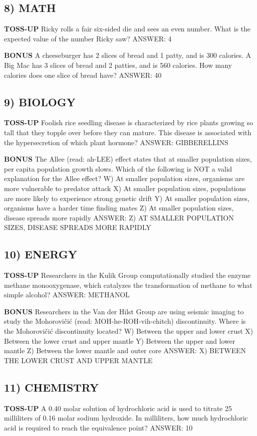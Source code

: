 \documentclass{article}
\begin{document}
\subsection*{8) MATH}
\textbf{TOSS-UP}
Ricky rolls a fair six-sided die and sees an even number. What is the expected value of the number Ricky saw?
ANSWER: 4

\textbf{BONUS}
A cheeseburger has 2 slices of bread and 1 patty, and is 300 calories. A Big Mac has 3 slices of bread and 2 patties, and is 560 calories. How many calories does one slice of bread have?
ANSWER: 40

\subsection*{9) BIOLOGY}
\textbf{TOSS-UP}
Foolish rice seedling disease is characterized by rice plants growing so tall that they topple over before they can mature. This disease is associated with the hypersecretion of which plant hormone?
ANSWER: GIBBERELLINS

\textbf{BONUS}
The Allee (read: ah-LEE) effect states that at smaller population sizes, per capita population growth slows. Which of the following is NOT a valid explanation for the Allee effect?
W) At smaller population sizes, organisms are more vulnerable to predator attack
X) At smaller population sizes, populations are more likely to experience strong genetic drift
Y) At smaller population sizes, organisms have a harder time finding mates
Z) At smaller population sizes, disease spreads more rapidly
ANSWER: Z) AT SMALLER POPULATION SIZES, DISEASE SPREADS MORE RAPIDLY

\subsection*{10) ENERGY}
\textbf{TOSS-UP}
Researchers in the Kulik Group computationally studied the enzyme methane monooxygenase, which catalyzes the transformation of methane to what simple alcohol?
ANSWER: METHANOL

\textbf{BONUS}
Researchers in the Van der Hilst Group are using seismic imaging to study the Mohorovičić (read: MOH-he-ROH-vih-chitch) discontinuity. Where is the Mohorovičić discontinuity located?
W) Between the upper and lower crust
X) Between the lower crust and upper mantle
Y) Between the upper and lower mantle
Z) Between the lower mantle and outer core
ANSWER: X) BETWEEN THE LOWER CRUST AND UPPER MANTLE

\subsection*{11) CHEMISTRY}
\textbf{TOSS-UP}
A 0.40 molar solution of hydrochloric acid is used to titrate 25 milliliters of 0.16 molar sodium hydroxide. In milliliters, how much hydrochloric acid is required to reach the equivalence point?
ANSWER: 10
\end{document}
